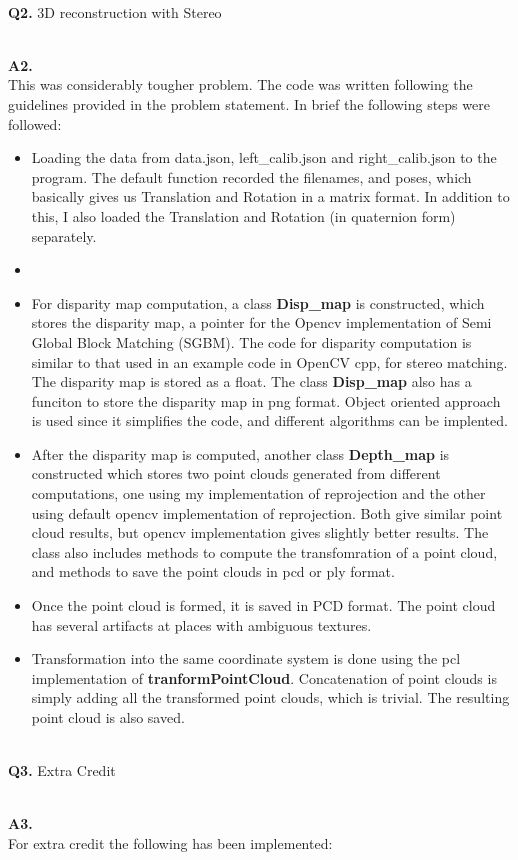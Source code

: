 \documentclass{article}
\newcommand\Problem[1]{
  \\
  \textbf{Q#1.}
}
\newcommand\Sol[1]{
  \\
  \textbf{A#1.}
  \\
}
\begin{document}
\Problem{2} 3D reconstruction with Stereo
\Sol{2} This was considerably tougher problem. The code was written following the guidelines provided in the problem statement. In brief the following steps were followed:
\begin{itemize}
\item Loading the data from data.json, left\_calib.json and right\_calib.json to the program. The default function recorded the filenames, and poses, which basically gives us Translation and Rotation in a matrix format. In addition to this, I also loaded the Translation and Rotation (in quaternion form) separately. 
\item 
\item For disparity map computation, a class \textbf{Disp\_map} is constructed, which stores the disparity map, a pointer for the Opencv implementation of Semi Global Block Matching (SGBM). The code for disparity computation is similar to that used in an example code in OpenCV cpp, for stereo matching. The disparity map is stored as a float. The class \textbf{Disp\_map} also has a funciton to store the disparity map in png format. Object oriented approach is used since it simplifies the code, and different algorithms can be implented.
\item After the disparity map is computed, another class \textbf{Depth\_map} is constructed which stores two point clouds generated from different computations, one using my implementation of reprojection and the other using default opencv implementation of reprojection. Both give similar point cloud results, but opencv implementation gives slightly better results. The class also includes methods to compute the transfomration of a point cloud, and methods to save the point clouds in pcd or ply format.
\item Once the point cloud is formed, it is saved in PCD format. The point cloud has several artifacts at places with ambiguous textures.
\item Transformation into the same coordinate system is done using the pcl implementation of \textbf{tranformPointCloud}. Concatenation of point clouds is simply adding all the transformed point clouds, which is trivial. The resulting point cloud is also saved.
\end{itemize}
\Problem{3} Extra Credit
\Sol{3}For extra credit the following has been implemented:
\end{document}
